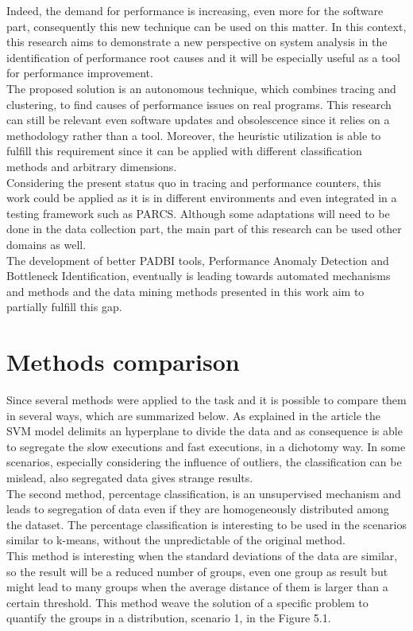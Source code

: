 \label{sec:Theme3}

Indeed, the demand for performance is increasing, even more for the software part, consequently this new technique can be used on this matter. In this context, this research aims to demonstrate a new perspective on system analysis in the identification of performance root causes and it will be especially useful as a tool for performance improvement. \\
The proposed solution is an autonomous technique, which combines tracing and clustering, to find causes of performance issues on real programs. This research can still be relevant even software updates and obsolescence since it relies on a methodology rather than a tool. Moreover, the heuristic utilization is able to fulfill this requirement since it can be applied with different classification methods and arbitrary dimensions. \\
Considering the present status quo in tracing and performance counters, this work could be applied as it is in different environments and even integrated in a testing framework such as PARCS. Although some adaptations will need to be done in the data collection part, the main part of this research can be used other domains as well.\\
The development of better PADBI tools, Performance Anomaly Detection and Bottleneck Identification, eventually is leading towards automated mechanisms and methods and the data mining methods presented in this work aim to partially fulfill this gap.
\section{Methods comparison}
Since several methods were applied to the task and it is possible to compare them in several ways, which are summarized below.
As explained in the article the SVM model delimits an hyperplane to divide the data and as consequence is able to segregate the slow executions and fast executions, in a dichotomy way. In some scenarios, especially considering the influence of outliers, the classification can be mislead, also segregated data gives strange results.\\
The second method, percentage classification, is an unsupervised mechanism and leads to segregation of data even if they are homogeneously distributed among the dataset. The percentage classification is interesting to be used in the scenarios similar to k-means, without the unpredictable of the original method.\\
This method is interesting when the standard deviations of the data are similar, so the result will be a reduced number of groups, even one group as result but might lead to many groups when the average distance of them is larger than a certain threshold. This method weave the solution of a specific problem to quantify the groups in a distribution, scenario 1, in the Figure 5.1. 
 
